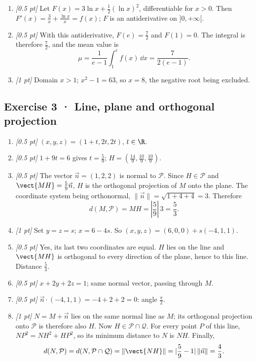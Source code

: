 \begin{enumerate}
\item \textit{[0.5 pt]} Let $F(x)=3\ln x+\frac12(\ln x)^2$, differentiable for $x>0$. Then $F'(x)=\frac{3}{x}+\frac{\ln x}{x}=f(x)$; $F$ is an antiderivative on $]0,+\infty[$.

\item \textit{[0.5 pt]} With this antiderivative, $F(e)=\frac{7}{2}$ and $F(1)=0$. The integral is therefore $\frac{7}{2}$, and the mean value is
\[\mu=\frac{1}{e-1}\int_1^e f(x)\,\dd x=\frac{7}{2(e-1)}.\]

\item \textit{[1 pt]} Domain $x>1$; $x^2-1=63$, so $x=8$, the negative root being excluded.

\end{enumerate}

\subsection*{Exercise 3 · Line, plane and orthogonal projection}\begin{enumerate}

\item \textit{[0.5 pt]} $(x,y,z)=(1+t,2t,2t)$, $t\in\R$.

\item \textit{[0.5 pt]} $1+9t=6$ gives $t=\frac{5}{9}$; $H=(\frac{14}{9},\frac{10}{9},\frac{10}{9})$.

\item \textit{[0.5 pt]} The vector $\vec n=(1,2,2)$ is normal to $\mathcal P$. Since $H\in\mathcal P$ and $\vect{MH}=\frac{5}{9}\vec n$, $H$ is the orthogonal projection of $M$ onto the plane. The coordinate system being orthonormal, $\|\vec n\|=\sqrt{1+4+4}=3$. Therefore
\[d(M,\mathcal P)=MH=|\frac{5}{9}|\,3=\frac{5}{3}.\]

\item \textit{[1 pt]} Set $y=z=s$; $x=6-4s$. So $(x,y,z)=(6,0,0)+s(-4,1,1)$.

\item \textit{[0.5 pt]} Yes, its last two coordinates are equal. $H$ lies on the line and $\vect{MH}$ is orthogonal to every direction of the plane, hence to this line. Distance $\frac{5}{3}$.

\item \textit{[0.5 pt]} $x+2y+2z=1$; same normal vector, passing through $M$.

\item \textit{[0.5 pt]} $\vec n\cdot(-4,1,1)=-4+2+2=0$: angle $\frac{\pi}{2}$.

\item \textit{[1 pt]} $N=M+\vec n$ lies on the same normal line as $M$; its orthogonal projection onto $\mathcal P$ is therefore also $H$. Now $H\in\mathcal P\cap\mathcal Q$. For every point $P$ of this line, $NP^2=NH^2+HP^2$, so its minimum distance to $N$ is $NH$. Finally,
\[d(N,\mathcal P)=d(N,\mathcal P\cap\mathcal Q)=\|\vect{NH}\|=|\frac{5}{9}-1|\,\|\vec n\|=\frac{4}{3}.\]

\end{enumerate}

